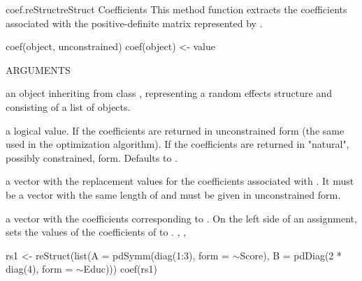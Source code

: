 \documentclass[pdftex]{article} \usepackage{url,graphicx}
\renewcommand{\Twiddle}{\mbox{\(\sim\)}}
\begin{document}
\begin{Helpfile}{coef.reStruct}{reStruct Coefficients}
This method function extracts the coefficients associated with the
positive-definite matrix represented by .
\begin{Example}
coef(object, unconstrained)
coef(object) <- value
\end{Example}
\begin{Argument}{ARGUMENTS}
\item[\Co{object:}]
an object inheriting from class ,
representing a random effects structure and consisting of a list of
 objects.
\item[\Co{unconstrained:}]
a logical value. If  the coefficients
are returned in unconstrained form (the same used in the optimization
algorithm). If  the coefficients are returned in
"natural", possibly constrained, form. Defaults to .
\item[\Co{value:}]
a vector with the replacement values for the coefficients
associated with . It must be a vector with the same length
of  and must be given in unconstrained form.
\end{Argument}
a vector with the coefficients corresponding to .
On the left side of an assignment, sets the values of the coefficients
of  to .
, ,
\need 15pt
\vspace{-16pt} 
\begin{Example}
rs1 <- reStruct(list(A = pdSymm(diag(1:3), form = \Twiddle Score),
  B = pdDiag(2 * diag(4), form = \Twiddle Educ)))
coef(rs1)
\end{Example}
\end{Helpfile}
\end{document}
